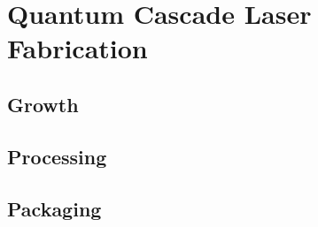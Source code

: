 \appendix
\chapter[Quantum Cascade Laser Fabrication]{Quantum Cascade Laser Fabrication}

\section{Growth}

\section{Processing}

\section{Packaging}